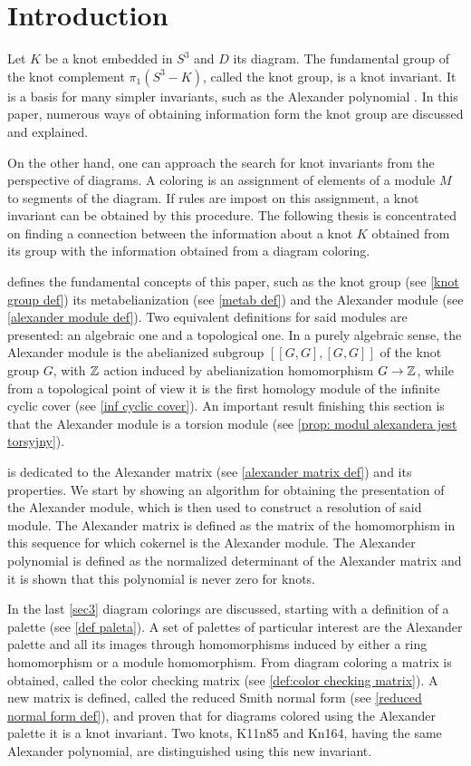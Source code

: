 \section*{Introduction}

Let $K$ be a knot embedded in $S^3$ and $D$ its diagram. The fundamental group of the knot complement $\pi_1(S^3-K)$, called the knot group, is a knot invariant. It is a basis for many simpler invariants, such as the Alexander polynomial \cite{alex-oryginal}. In this paper, numerous ways of obtaining information form the knot group are discussed and explained.

On the other hand, one can approach the search for knot invariants from the perspective of diagrams. A coloring is an assignment of elements of a module $M$ to segments of the diagram. If rules are impost on this assignment, a knot invariant can be obtained by this procedure. The following thesis is concentrated on finding a connection between the information about a knot $K$ obtained from its group with the information obtained from a diagram coloring.

 defines the fundamental concepts of this paper, such as the knot group (see \cref{knot group def}) its metabelianization (see \cref{metab def}) and the Alexander module (see \cref{alexander module def}). Two equivalent definitions for said modules are presented: an algebraic one and a topological one. In a purely algebraic sense, the Alexander module is the abelianized subgroup $[[G, G], [G, G]]$ of the knot group $G$, with $\operatorname{\mathbb{Z}}$ action induced by abelianization homomorphism $G\to \operatorname{\mathbb{Z}}$, while from a topological point of view it is the first homology module of the infinite cyclic cover (see \cref{inf cyclic cover}). An important result finishing this section is that the Alexander module is a torsion module (see \cref{prop: modul alexandera jest torsyjny}).

 is dedicated to the Alexander matrix (see \cref{alexander matrix def}) and its properties. We start by showing an algorithm for obtaining the presentation of the Alexander module, which is then used to construct a resolution of said module. The Alexander matrix is defined as the matrix of the homomorphism in this sequence for which cokernel is the Alexander module. The Alexander polynomial is defined as the normalized determinant of the Alexander matrix and it is shown that this polynomial is never zero for knots.

In the last \cref{sec3} diagram colorings are discussed, starting with a definition of a palette (see \cref{def paleta}). A set of palettes of particular interest are the Alexander palette and all its images through homomorphisms induced by either a ring homomorphism or a module homomorphism. From diagram coloring a matrix is obtained, called the color checking matrix (see \cref{def:color checking matrix}). A new matrix is defined, called the reduced Smith normal form (see \cref{reduced normal form def}), and proven that for diagrams colored using the Alexander palette it is a knot invariant. Two knots, K11n85 and Kn164, having the same Alexander polynomial, are distinguished using this new invariant.


